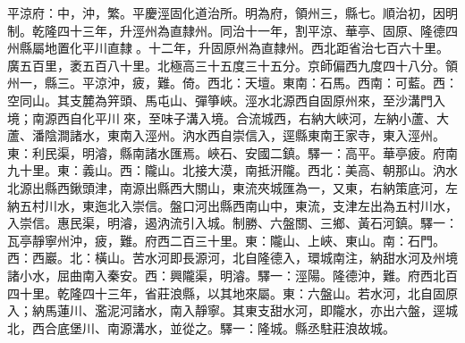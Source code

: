 \begin{pinyinscope}
平涼府：中，沖，繁。平慶涇固化道治所。明為府，領州三，縣七。順治初，因明制。乾隆四十三年，升涇州為直隸州。同治十一年，割平涼、華亭、固原、隆德四州縣屬地置化平川直隸。十二年，升固原州為直隸州。西北距省治七百六十里。廣五百里，袤五百八十里。北極高三十五度三十五分。京師偏西九度四十八分。領州一，縣三。平涼沖，疲，難。倚。西北：天壇。東南：石馬。西南：可藍。西：空同山。其支麓為笄頭、馬屯山、彈箏峽。涇水北源西自固原州來，至沙溝門入境；南源西自化平川來，至味子溝入境。合流城西，右納大峽河，左納小蘆、大蘆、潘陰澗諸水，東南入涇州。汭水西自崇信入，逕縣東南王家寺，東入涇州。東：利民渠，明濬，縣南諸水匯焉。峽石、安國二鎮。驛一：高平。華亭疲。府南九十里。東：義山。西：隴山。北接大漠，南抵汧隴。西北：美高、朝那山。汭水北源出縣西鍬頭津，南源出縣西大關山，東流夾城匯為一，又東，右納策底河，左納五村川水，東迤北入崇信。盤口河出縣西南山中，東流，支津左出為五村川水，入崇信。惠民渠，明濬，遏汭流引入城。制勝、六盤關、三鄉、黃石河鎮。驛一：瓦亭靜寧州沖，疲，難。府西二百三十里。東：隴山、上峽、東山。南：石門。西：西巖。北：橫山。苦水河即長源河，北自隆德入，環城南注，納甜水河及州境諸小水，屈曲南入秦安。西：興隴渠，明濬。驛一：涇陽。隆德沖，難。府西北百四十里。乾隆四十三年，省莊浪縣，以其地來屬。東：六盤山。若水河，北自固原入；納馬蓮川、濫泥河諸水，南入靜寧。其東支甜水河，即隴水，亦出六盤，逕城北，西合底堡川、南源溝水，並從之。驛一：隆城。縣丞駐莊浪故城。


\end{pinyinscope}
